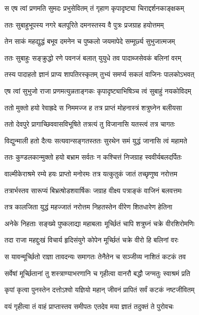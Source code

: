 \twolineshloka
{स एष त्वां प्रणमति सुमदः प्रभुसेवितम्}
{तं गृहाण कृपादृष्ट्या चिराद्दर्शनकाङ्क्षकम्}%

\twolineshloka
{ततः सुबाहुभूपस्य नगरे बलपूरिते}
{दमनस्तस्य वै पुत्रः प्रजग्राह हयोत्तमम्}%

\twolineshloka
{तेन साकं महद्युद्धं बभूव दमनेन च}
{पुष्कलो जयमापेदे सम्मूर्छ्य सुभुजात्मजम्}%

\twolineshloka
{ततः सुबाहुः सङ्क्रुद्धो रणे पवनजं बलात्}
{युयुधे तव पादाब्जसेवकं बलिनां वरम्}%

\twolineshloka
{तस्य पादाहतो ज्ञानं प्राप्य शापतिरस्कृतम्}
{तुभ्यं समर्प्य सकलं वाजिनः पालकोऽभवत्}%

\twolineshloka
{एष त्वां सुभुजो राजा प्रणमत्युन्नताङ्गकः}
{कृपादृष्ट्याभिषिञ्च त्वं सुबाहुं नयकोविदम्}%

\twolineshloka
{ततो मुक्तो हयो रेवाह्रदे स निममज्ज ह}
{तत्र प्राप्तं मोहनास्त्रं शत्रुघ्नेन बलीयसा}%

\twolineshloka
{ततो देवपुरे प्रागाच्छिववासविभूषिते}
{तत्रत्यं तु विजानासि यतस्त्वं तत्र चागतः}%

\twolineshloka
{विद्युन्माली हतो दैत्यः सत्यवान्सङ्गतस्ततः}
{सुरथेन समं युद्धं जानासि त्वं महामते}%

\twolineshloka
{ततः कुण्डलकान्मुक्तो हयो बभ्राम सर्वतः}
{न कश्चित्तं निजग्राह स्ववीर्यबलदर्पितः}%

\twolineshloka
{वाल्मीकेराश्रमे रम्ये हयः प्राप्तो मनोरमः}
{तत्र यत्कुतुकं जातं तच्छृणुष्व नरोत्तम}%

\twolineshloka
{तत्रार्भस्तव सारूप्यं बिभ्रत्षोडशवार्षिकः}
{जग्राह वीक्ष्य पत्राङ्कं वाजिनं बलवत्तमः}%

\twolineshloka
{तत्र कालजिता युद्धं महज्जातं नरोत्तम}
{निहतस्तेन वीरेण शितधारेण हेतिना}%

\twolineshloka
{अनेके निहताः सङ्ख्ये पुष्कलाद्या महाबलाः}
{मूर्च्छितं चापि शत्रुघ्नं चक्रे वीरशिरोमणिः}%

\twolineshloka
{तदा राजा महद्दुःखं विचार्य हृदिसंयुगे}
{कोपेन मूर्च्छितं चक्रे वीरो हि बलिनां वरः}%

\twolineshloka
{स यावन्मूर्च्छितो राज्ञा तावदन्यः समागतः}
{तेनैतेन च सञ्जीव्य नाशितं कटकं तव}%

\twolineshloka
{सर्वेषां मूर्च्छितानां तु शस्त्राण्याभरणानि च}
{गृहीत्वा वानरौ बद्धौ जग्मतुः स्वाश्रमं प्रति}%

\twolineshloka
{कृपां कृत्वा पुनस्तेन दत्तोऽश्वो यज्ञियो महान्}
{जीवनं प्रापितं सर्वं कटकं नष्टजीवितम्}%

\twolineshloka
{वयं गृहीत्वा तं वाहं प्राप्तास्तव समीपतः}
{एतदेव मया ज्ञातं तदुक्तं ते पुरोवचः}%

